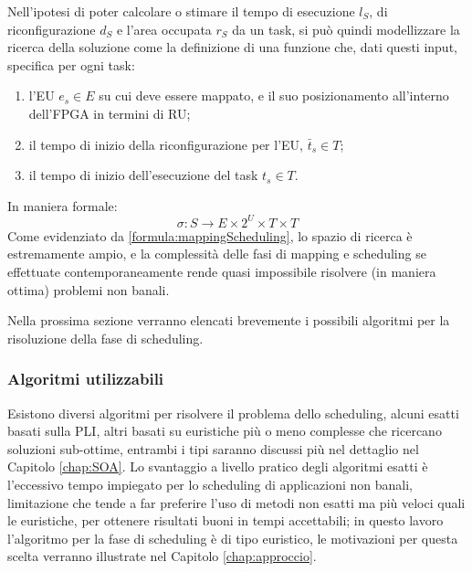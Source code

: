 Nell'ipotesi di poter calcolare o stimare il tempo di esecuzione $l_{S}$, di 
riconfigurazione $d_{S}$ e l'area occupata $r_{S}$ da un task, si può quindi modellizzare 
la ricerca della soluzione come la definizione di una funzione 
che, dati questi input, specifica per ogni task:
\begin{enumerate}
 \item l'\ac{EU} $e_s \in E$ su cui deve essere mappato, e il suo posizionamento 
all'interno dell'\ac{FPGA} in termini di \ac{RU};
 \item il tempo di inizio della riconfigurazione per l'\ac{EU}, $\bar{t}_s \in T$;
 \item il tempo di inizio dell'esecuzione del task $t_s \in T$.
\end{enumerate}

In maniera formale:
\begin{equation}
\label{formula:mappingScheduling}
 \sigma : S \rightarrow E \times 2^{U} \times T \times T
\end{equation}
Come evidenziato da \eqref{formula:mappingScheduling}, lo spazio di ricerca è 
estremamente ampio, e la complessità delle fasi di mapping e scheduling se effettuate 
contemporaneamente rende quasi impossibile risolvere (in maniera ottima) problemi non 
banali.

Nella prossima sezione verranno elencati brevemente i possibili algoritmi per la 
risoluzione della fase di scheduling.

\subsubsection{Algoritmi utilizzabili}
Esistono diversi algoritmi per risolvere il problema dello scheduling, alcuni esatti 
basati sulla \ac{PLI}, altri basati su euristiche più o meno complesse che ricercano 
soluzioni sub-ottime, entrambi i tipi saranno discussi più nel dettaglio nel Capitolo 
\ref{chap:SOA}. Lo svantaggio a livello pratico degli algoritmi esatti è l'eccessivo tempo 
impiegato per lo scheduling di applicazioni non banali, limitazione che tende a far 
preferire l'uso di metodi non esatti ma più veloci quali le euristiche, per ottenere 
risultati buoni in tempi accettabili; in questo lavoro l'algoritmo per la fase di 
scheduling è di tipo euristico, le motivazioni per questa scelta verranno illustrate nel 
Capitolo \ref{chap:approccio}.
